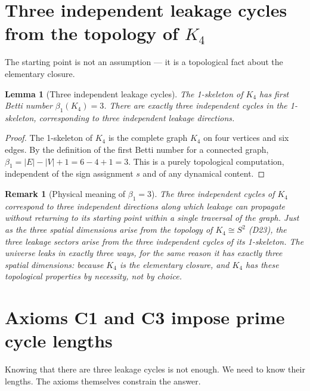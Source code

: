 \documentclass[12pt,a4paper]{article}
\newtheorem{lemma}[theorem]{Lemma}
\newtheorem{remark}[theorem]{Remark}
\newcommand{\Kfour}{K_4}
\begin{document}
\section{Three independent leakage cycles from the topology of \texorpdfstring{$\Kfour$}{K4}}
\label{sec:beta1}

The starting point is not an assumption — it is a topological fact about the elementary closure.

\begin{lemma}[Three independent leakage cycles]
\label{lem:beta1}
The 1-skeleton of $\Kfour$ has first Betti number $\beta_1(\Kfour) = 3$. There are exactly three independent cycles in the 1-skeleton, corresponding to three independent leakage directions.
\end{lemma}

\begin{proof}
The 1-skeleton of $\Kfour$ is the complete graph $K_4$ on four vertices and six edges. By the definition of the first Betti number for a connected graph, $\beta_1 = |E| - |V| + 1 = 6 - 4 + 1 = 3$. This is a purely topological computation, independent of the sign assignment $s$ and of any dynamical content.
\end{proof}

\begin{remark}[Physical meaning of $\beta_1 = 3$]
The three independent cycles of $\Kfour$ correspond to three independent directions along which leakage can propagate without returning to its starting point within a single traversal of the graph. Just as the three spatial dimensions arise from the topology of $\Kfour \cong S^2$ (D23), the three leakage sectors arise from the three independent cycles of its 1-skeleton. The universe leaks in exactly three ways, for the same reason it has exactly three spatial dimensions: because $\Kfour$ is the elementary closure, and $\Kfour$ has these topological properties by necessity, not by choice.
\end{remark}

\section{Axioms C1 and C3 impose prime cycle lengths}
\label{sec:prime}

Knowing that there are three leakage cycles is not enough. We need to know their lengths. The axioms themselves constrain the answer.
\end{document}
